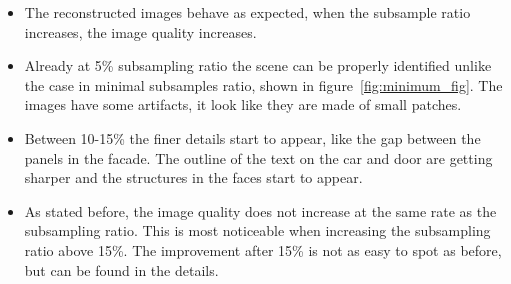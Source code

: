 \begin{itemize}
\item The reconstructed images behave as expected, when the subsample ratio increases, the image quality increases. 

\item Already at 5\% subsampling ratio the scene can be properly identified unlike the case in minimal subsamples ratio, shown in figure~\ref{fig:minimum_fig}. The images have some artifacts, it look like they are made of small patches.

\item Between 10-15\% the finer details start to appear, like the gap between the panels in the facade. The outline of the text on the car and door are getting sharper and the structures in the faces start to appear.

\item As stated before, the image quality does not increase at the same rate as the subsampling ratio. This is most noticeable when increasing the subsampling ratio above 15\%. The improvement after 15\% is not as easy to spot as before, but can be found in the details. 
\end{itemize}



 





